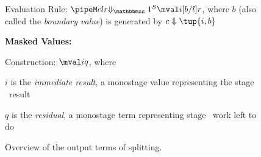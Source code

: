 \begin{figure*}
\begin{abstrsyn}
\hspace{2em} Evaluation Rule: $\sepredone {\pipeM c l r} {\mval i {[b/l]r}}$, where $b$ (also called the {\em boundary value}) is generated by $\reduce c {\tup{i,b}}$

\textbf{Masked Values:}

\hspace{2em} Construction: $\mval i q$, where 
	
	\hspace{4em} $i$ is the {\em immediate result}, a monostage value representing the stage \bbone\ result
	
	\hspace{4em} $q$ is the {\em residual}, a monostage term representing stage \bbtwo\ work left to do

\end{abstrsyn}
\caption{Overview of the output terms of splitting.}
\label{fig:outputTermSummary}
\end{figure*}

